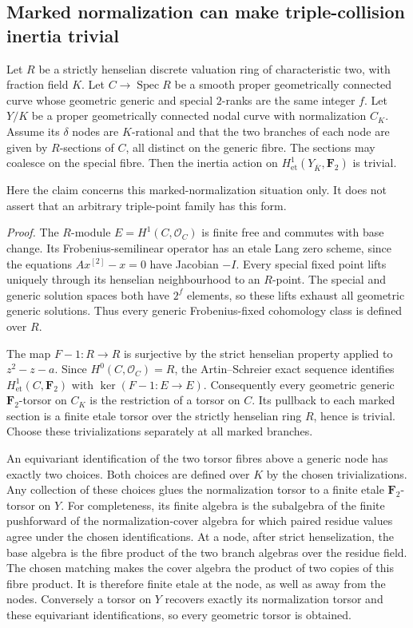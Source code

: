 \subsection*{Marked normalization can make triple-collision inertia trivial}

Let $R$ be a strictly henselian discrete valuation ring of characteristic
two, with fraction field $K$. Let $C\to\operatorname{Spec}R$ be a smooth
proper geometrically connected curve whose geometric generic and special
$2$-ranks are the same integer $f$. Let $Y/K$ be a proper geometrically
connected nodal curve with normalization $C_K$. Assume its $\delta$ nodes
are $K$-rational and that the two branches of each node are given by
$R$-sections of $C$, all distinct on the generic fibre. The sections may
coalesce on the special fibre. Then the inertia action on
$H^1_{\mathrm{et}}(Y_{\overline K},\mathbf F_2)$ is trivial.

Here the claim concerns this marked-normalization situation only. It does
not assert that an arbitrary triple-point family has this form.

\emph{Proof.}
The $R$-module $E=H^1(C,\mathcal O_C)$ is finite free and commutes with
base change. Its Frobenius-semilinear operator has an etale Lang zero
scheme, since the equations $A x^{[2]}-x=0$ have Jacobian $-I$.
Every special fixed point lifts uniquely through its henselian
neighbourhood to an $R$-point. The special and generic solution spaces
both have $2^f$ elements, so these lifts exhaust all geometric generic
solutions. Thus every generic Frobenius-fixed cohomology class is defined
over $R$.

The map $F-1:R\to R$ is surjective by the strict henselian property
applied to $z^2-z-a$. Since $H^0(C,\mathcal O_C)=R$, the Artin--Schreier
exact sequence identifies $H^1_{\mathrm{et}}(C,\mathbf F_2)$ with
$\ker(F-1:E\to E)$. Consequently every geometric generic
$\mathbf F_2$-torsor on $C_K$ is the restriction of a torsor on $C$.
Its pullback to each marked section is a finite etale torsor over the
strictly henselian ring $R$, hence is trivial. Choose these
trivializations separately at all marked branches.

An equivariant identification of the two torsor fibres above a generic
node has exactly two choices. Both choices are defined over $K$ by the
chosen trivializations. Any collection of these choices glues the
normalization torsor to a finite etale $\mathbf F_2$-torsor on $Y$.
For completeness, its finite algebra is the subalgebra of the finite
pushforward of the normalization-cover algebra for which paired residue
values agree under the chosen identifications. At a node, after strict
henselization, the base algebra is the fibre product of the two branch
algebras over the residue field. The chosen matching makes the cover
algebra the product of two copies of this fibre product. It is therefore
finite etale at the node, as well as away from the nodes. Conversely a
torsor on $Y$ recovers exactly its normalization torsor and these
equivariant identifications, so every geometric torsor is obtained.

